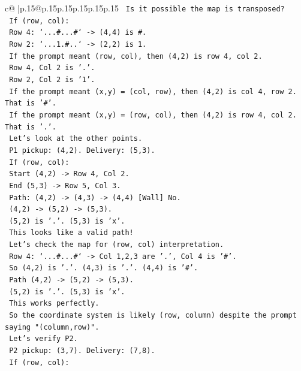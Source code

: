 \documentclass{article}
\begin{document}
{\begin{supertabular}{c@{$\;$}|p{.15\linewidth}@{}p{.15\linewidth}p{.15\linewidth}p{.15\linewidth}p{.15\linewidth}p{.15\linewidth}}
{{{\texttt{   Is it possible the map is transposed?} \\
\texttt{   If (row, col):} \\
\texttt{   Row 4: `...\#...\#` {-}> (4,4) is \#.} \\
\texttt{   Row 2: `...1.\#..` {-}> (2,2) is 1.} \\
\texttt{   If the prompt meant (row, col), then (4,2) is row 4, col 2.} \\
\texttt{   Row 4, Col 2 is '.'.} \\
\texttt{   Row 2, Col 2 is '1'.} \\
\texttt{   If the prompt meant (x,y) = (col, row), then (4,2) is col 4, row 2. That is '\#'.} \\
\texttt{   If the prompt meant (x,y) = (row, col), then (4,2) is row 4, col 2. That is '.'.} \\
\texttt{   Let's look at the other points.} \\
\texttt{   P1 pickup: (4,2). Delivery: (5,3).} \\
\texttt{   If (row, col):} \\
\texttt{   Start (4,2) {-}> Row 4, Col 2.} \\
\texttt{   End (5,3) {-}> Row 5, Col 3.} \\
\texttt{   Path: (4,2) {-}> (4,3) {-}> (4,4) {[}Wall{]} No.} \\
\texttt{   (4,2) {-}> (5,2) {-}> (5,3).} \\
\texttt{   (5,2) is '.'. (5,3) is 'x'.} \\
\texttt{   This looks like a valid path!} \\
\texttt{   Let's check the map for (row, col) interpretation.} \\
\texttt{   Row 4: `...\#...\#` {-}> Col 1,2,3 are '.', Col 4 is '\#'.} \\
\texttt{   So (4,2) is '.'. (4,3) is '.'. (4,4) is '\#'.} \\
\texttt{   Path (4,2) {-}> (5,2) {-}> (5,3).} \\
\texttt{   (5,2) is '.'. (5,3) is 'x'.} \\
\texttt{   This works perfectly.} \\
\texttt{   So the coordinate system is likely (row, column) despite the prompt saying "(column,row)".} \\
\texttt{   Let's verify P2.} \\
\texttt{   P2 pickup: (3,7). Delivery: (7,8).} \\
\texttt{   If (row, col):} \\
}}}
\end{supertabular}}
\end{document}
